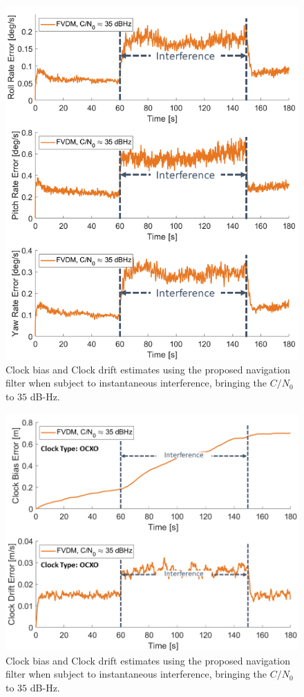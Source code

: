\documentclass[12pt]{report}
\begin{document}
\begin{figure}[!ht]
  \centering
  \includegraphics[width=0.75\linewidth]{Figures/Results/trajectoryfigure/Slide12.PNG}
  \caption{Clock bias and Clock drift estimates using the proposed navigation filter when subject to instantaneous interference, bringing the \(C/N_0\) to \(35\) dB-Hz.}\label{fig:Ang35}
\end{figure}


\begin{figure}[!ht]
  \centering
  \includegraphics[width=0.75\linewidth]{Figures/Results/trajectoryfigure/Slide24.PNG}
  \caption{Clock bias and Clock drift estimates using the proposed navigation filter when subject to instantaneous interference, bringing the \(C/N_0\) to \(35\) dB-Hz.}\label{fig:Clk35}
\end{figure}
\end{document}
